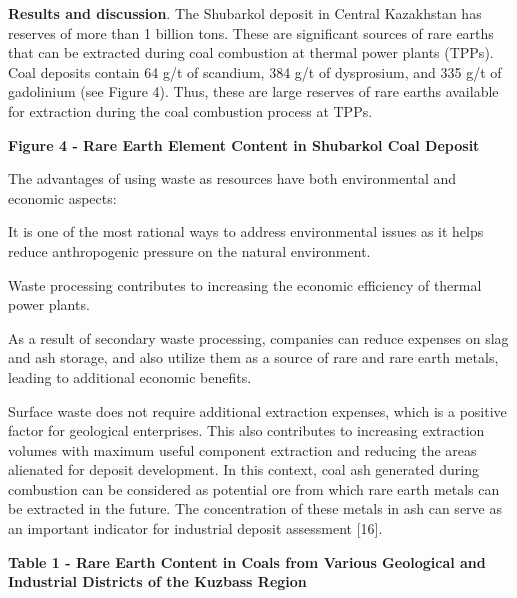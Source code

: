 {\bfseries Results and discussion}. The Shubarkol deposit in Central
Kazakhstan has reserves of more than 1 billion tons. These are
significant sources of rare earths that can be extracted during coal
combustion at thermal power plants (TPPs). Coal deposits contain 64 g/t
of scandium, 384 g/t of dysprosium, and 335 g/t of gadolinium (see
Figure 4). Thus, these are large reserves of rare earths available for
extraction during the coal combustion process at TPPs.

{\bfseries Figure 4 - Rare Earth Element Content in Shubarkol Coal Deposit}

The advantages of using waste as resources have both environmental and
economic aspects:

It is one of the most rational ways to address environmental issues as
it helps reduce anthropogenic pressure on the natural environment.

Waste processing contributes to increasing the economic efficiency of
thermal power plants.

As a result of secondary waste processing, companies can reduce expenses
on slag and ash storage, and also utilize them as a source of rare and
rare earth metals, leading to additional economic benefits.

Surface waste does not require additional extraction expenses, which is
a positive factor for geological enterprises. This also contributes to
increasing extraction volumes with maximum useful component extraction
and reducing the areas alienated for deposit development. In this
context, coal ash generated during combustion can be considered as
potential ore from which rare earth metals can be extracted in the
future. The concentration of these metals in ash can serve as an
important indicator for industrial deposit assessment {[}16{]}.

{\bfseries Table 1 - Rare Earth Content in Coals from Various Geological
and Industrial Districts of the Kuzbass Region}

